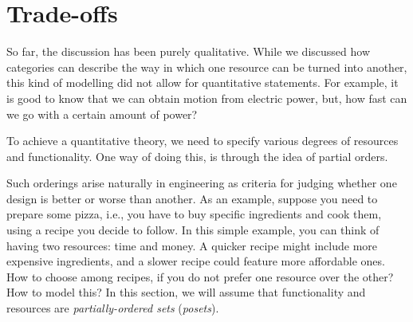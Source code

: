 

\section{Trade-offs}


So far, the discussion has been purely qualitative. While we discussed how
categories can describe the way in which one resource can be turned into another,
this kind of modelling did not allow for quantitative statements. For example, it
is good to know that we can obtain motion from electric power, but, how fast can
we go with a certain amount of power?

To achieve a quantitative theory, we need to specify various degrees of resources and functionality.
One way of doing this, is through the idea of partial orders.


Such orderings arise naturally in engineering as criteria for judging whether one design is better or worse than another. As an example, suppose you need to prepare some pizza, i.e., you have to buy specific ingredients and cook them, using a recipe you decide to follow. In this simple example, you can think of having two resources: time and money. A quicker recipe might include more expensive ingredients, and a slower recipe could feature more affordable ones. How to choose among recipes, if you do not prefer one resource over the other? How to model this? In this section, we will assume that functionality and resources
are \emph{partially-ordered sets} (\emph{posets}).

